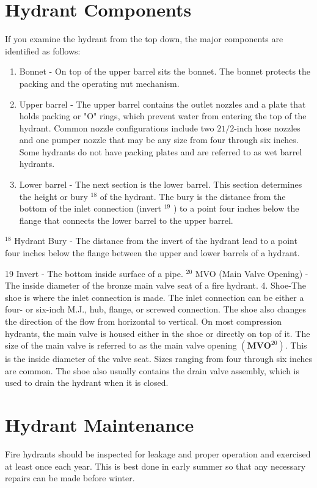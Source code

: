 \documentclass[10pt]{article}
\begin{document}
\section{Hydrant Components}
If you examine the hydrant from the top down, the major components are identified as follows:

\begin{enumerate}
  \item Bonnet - On top of the upper barrel sits the bonnet. The bonnet protects the packing and the operating nut mechanism.

  \item Upper barrel - The upper barrel contains the outlet nozzles and a plate that holds packing or "O" rings, which prevent water from entering the top of the hydrant. Common nozzle configurations include two $21 / 2$-inch hose nozzles and one pumper nozzle that may be any size from four through six inches. Some hydrants do not have packing plates and are referred to as wet barrel hydrants.

  \item Lower barrel - The next section is the lower barrel. This section determines the height or bury ${ }^{18}$ of the hydrant. The bury is the distance from the bottom of the inlet connection (invert ${ }^{19}$ ) to a point four inches below the flange that connects the lower barrel to the upper barrel.

\end{enumerate}
${ }^{18}$ Hydrant Bury - The distance from the invert of the hydrant lead to a point four inches below the flange between the upper and lower barrels of a hydrant.

19 Invert - The bottom inside surface of a pipe. ${ }^{20}$ MVO (Main Valve Opening) - The inside diameter of the bronze main valve seat of a fire hydrant. 4. Shoe-The shoe is where the inlet connection is made. The inlet connection can be either a four- or six-inch M.J., hub, flange, or screwed connection. The shoe also changes the direction of the flow from horizontal to vertical. On most compression hydrants, the main valve is housed either in the shoe or directly on top of it. The size of the main valve is referred to as the main valve opening $\left(\mathbf{M V O}^{20}\right)$. This is the inside diameter of the valve seat. Sizes ranging from four through six inches are common. The shoe also usually contains the drain valve assembly, which is used to drain the hydrant when it is closed.

\section{Hydrant Maintenance}
Fire hydrants should be inspected for leakage and proper operation and exercised at least once each year. This is best done in early summer so that any necessary repairs can be made before winter.
\end{document}
